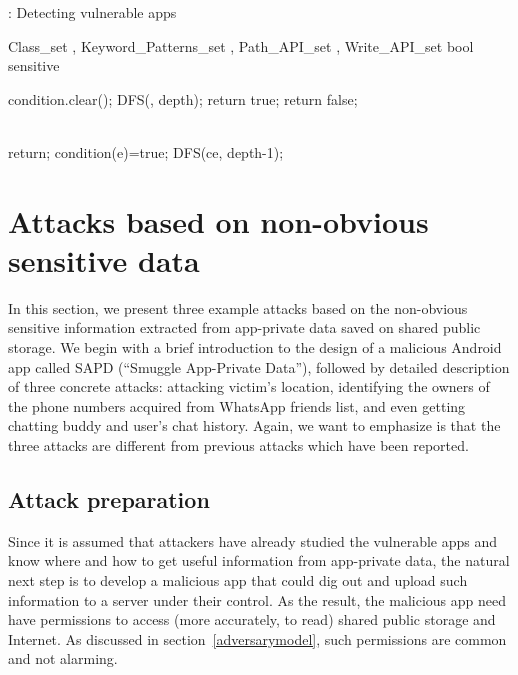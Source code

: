 \documentclass{sig-alternate}
\begin{document}
\renewcommand{\algorithmicrequire}{\textbf{Input:}}
\renewcommand{\algorithmicensure}{\textbf{Output:}}

\begin{algorithm}[htb]
\label{alg:algorithm1}
\caption{: Detecting vulnerable apps}
\begin{algorithmic}[1]
\Require Class\_set , Keyword\_Patterns\_set , Path\_API\_set , Write\_API\_set 
\Ensure bool sensitive

\State condition.clear();
\State DFS(, depth);
\State return true;
\EndIf
\EndFor
\EndFor
\State return false;

\\

\State return;
\EndIf
{}
\State condition(e)=true;
\EndFor
{}
\State DFS(ce, depth-1);
\EndFor
\EndProcedure

\end{algorithmic}
\end{algorithm}



\section{Attacks based on non-obvious \\sensitive data}
\label{sec:attack}




In this section, we present three example attacks based on the non-obvious sensitive information extracted from app-private data saved on shared public storage. We begin with a brief introduction to the design of a malicious Android app called SAPD (``Smuggle App-Private Data''), followed by detailed description of three concrete attacks: attacking victim's location, identifying the owners of the phone numbers acquired from WhatsApp friends list, and even getting chatting buddy and user's chat history. Again, we want to emphasize is that the three attacks are different from previous attacks which have been reported.


\subsection{Attack preparation}

Since it is assumed that attackers have already studied the vulnerable apps and know where and how to get useful information from app-private data, the natural next step is to develop a malicious app that could dig out and upload such information to a server under their control. As the result, the malicious app need have permissions to access (more accurately, to read) shared public storage and Internet. As discussed in section~\ref{adversarymodel}, such permissions are common and not alarming.
\end{document}
